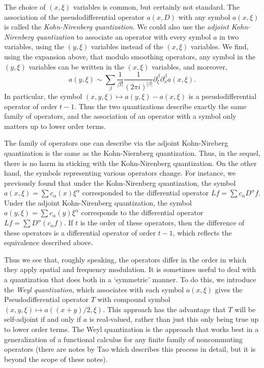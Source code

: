The choice of $(x,\xi)$ variables is common, but certainly not standard. The association of the pseudodifferential operator $a(x,D)$ with any symbol $a(x,\xi)$ is called the \emph{Kohn-Nirenberg quantization}. We could also use the \emph{adjoint Kohn-Nirenberg quantization} to associate an operator with every symbol $a$ in two variables, using the $(y,\xi)$ variables instead of the $(x,\xi)$ variables. We find, using the expansion above, that modulo smoothing operators, any symbol in the $(y,\xi)$ variables can be written in the $(x,\xi)$ variables, and moreover,
%
\[ a(y,\xi) \sim \sum_\beta \frac{1}{\beta!} \frac{1}{(2 \pi i)^{|\beta|}} \partial^\beta_\xi \partial^\beta_x a(x,\xi). \]
%
In particular, the symbol $(x,y,\xi) \mapsto a(y,\xi) - a(x,\xi)$ is a pseudodifferential operator of order $t - 1$. Thus the two quantizations describe exactly the same family of operators, and the association of an operator with a symbol only matters up to lower order terms.

The family of operators one can describe via the adjoint Kohn-Nireberg quantization is the same as the Kohn-Niernberg quantization. Thus, in the sequel, there is no harm in sticking with the Kohn-Nirenberg quantization. On the other hand, the symbols representing various operators change. For instance, we previously found that under the Kohn-Nirenberg quantization, the symbol $a(x,\xi) = \sum c_\alpha(x) \xi^\alpha$ corresponded to the differential operator $Lf = \sum c_\alpha D^\alpha f$. Under the adjoint Kohn-Nirenberg quantization, the symbol $a(y,\xi) = \sum c_\alpha(y) \xi^\alpha$ corresponds to the differential operator $Lf = \sum D^\alpha( c_\alpha f)$. If $t$ is the order of these operators, then the difference of these operators is a differential operator of order $t-1$, which reflects the equivalence described above.

Thus we see that, roughly speaking, the operators differ in the order in which they apply spatial and frequency modulation. It is sometimes useful to deal with a quantization that does both in a `symmetric' manner. To do this, we introduce the \emph{Weyl quantization}, which associates with each symbol $a(x,\xi)$ gives the Pseudodifferential operator $T$ with compound symbol $(x,y,\xi) \mapsto a((x + y)/2, \xi)$. This approach has the advantage that $T$ will be self-adjoint if and only if $a$ is real-valued, rather than just this only being true up to lower order terms. The Weyl quantization is the approach that works best in a generalization of a functional calculus for any finite family of noncommuting operators (there are notes by Tao which describes this process in detail, but it is beyond the scope of these notes).

